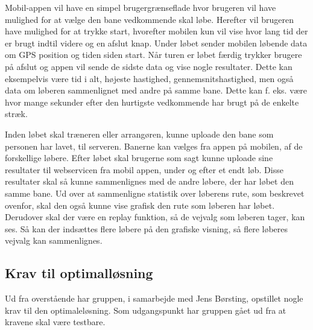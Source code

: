 Mobil-appen vil have en simpel brugergrænseflade hvor brugeren vil have mulighed for at vælge den bane vedkommende skal løbe. Herefter vil brugeren have mulighed for at trykke start, hvorefter mobilen kun vil vise hvor lang tid der er brugt indtil videre og en afslut knap. Under løbet sender mobilen løbende data om GPS position og tiden siden start. Når turen er løbet færdig trykker brugere på afslut og appen vil sende de sidste data og vise nogle resultater. Dette kan eksempelvis være tid i alt, højeste hastighed, gennemsnitshastighed, men også data om løberen sammenlignet med andre på samme bane. Dette kan f. eks. være hvor mange sekunder efter den hurtigste vedkommende har brugt på de enkelte stræk.

Inden løbet skal træneren eller arrangøren, kunne uploade den bane som personen har lavet, til serveren. Banerne kan vælges fra appen på mobilen, af de forskellige løbere. Efter løbet skal brugerne som sagt kunne uploade sine resultater til webservicen fra mobil appen, under og efter et endt løb. Disse resultater skal så kunne sammenlignes med de andre løbere, der har løbet den samme bane. Ud over at sammenligne statistik over løberens rute, som beskrevet ovenfor, skal den også kunne vise grafisk den rute som løberen har løbet. Derudover skal der være en replay funktion, så de vejvalg som løberen tager, kan ses. Så kan der indsættes flere løbere på den grafiske visning, så flere løberes vejvalg kan sammenlignes.

\subsection{Krav til optimalløsning}
Ud fra overstående har gruppen, i samarbejde med Jens Børsting, opstillet nogle krav til den optimaleløsning. Som udgangspunkt har gruppen gået ud fra at kravene skal være testbare. 

